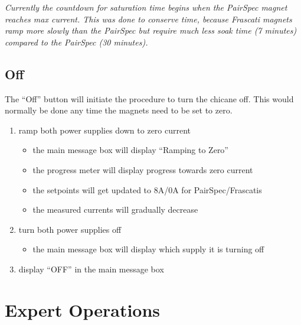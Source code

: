 \documentclass[amsmath,amssymb,notitlepage,11pt]{revtex4-1}
\begin{document}
{\em Currently the countdown for saturation time begins when the PairSpec magnet reaches max current.  This was done to conserve time, because Frascati magnets ramp more slowly than the PairSpec but require much less soak time (7 minutes) compared to the PairSpec (30 minutes).}
\subsection{Off}
The ``Off'' button will initiate the procedure to turn the chicane off.  This would normally be done any time the magnets need to be set to zero.
\begin{enumerate}
    \item ramp both power supplies down to zero current
    \begin{itemize}
    \item the main message box will display ``Ramping to Zero''
    \item the progress meter will display progress towards zero current
    \item the setpoints will get updated to 8A/0A for PairSpec/Frascatis
    \item the measured currents will gradually decrease
    \end{itemize}
    \item turn both power supplies off
    \begin{itemize}
    \item the main message box will display which supply it is turning off
    \end{itemize}
    \item display ``OFF'' in the main message box
\end{enumerate}

\section{Expert Operations}
\end{document}
